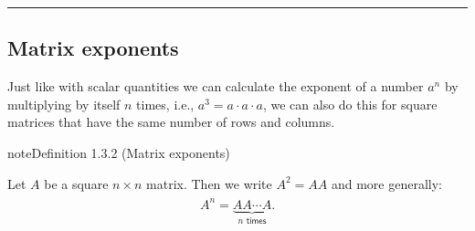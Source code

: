 \documentclass[letterpaper,10pt,english]{jupyterBook}
\begin{document}
\bigskip\hrule\bigskip


\ignorespaces 

\subsection{Matrix exponents}
\label{\detokenize{_pages/1.2_Matrix_multiplication:matrix-exponents}}\label{\detokenize{_pages/1.2_Matrix_multiplication:index-1}}
\sphinxAtStartPar
Just like with scalar quantities we can calculate the exponent of a number \(a^n\) by multiplying by itself \(n\) times, i.e., \(a^3 = a \cdot a \cdot a\), we can also do this for square matrices that have the same number of rows and columns.
\label{_pages/1.2_Matrix_multiplication:matrix-exponents-definition}
\begin{sphinxadmonition}{note}{Definition 1.3.2 (Matrix exponents)}



\sphinxAtStartPar
Let \(A\) be a square \(n \times n\) matrix. Then we write \(A^2=AA\) and more generally:
\begin{equation}\label{equation:_pages/1.2_Matrix_multiplication:matrix-exponent-equation}
\begin{split} \begin{align*}
    A^n = \underbrace{A A \cdots A}_{n \textsf{ times}}.
\end{align*} \end{split}
\end{equation}\end{sphinxadmonition}
\label{_pages/1.2_Matrix_multiplication:matrix-exponents-example}
\end{document}
